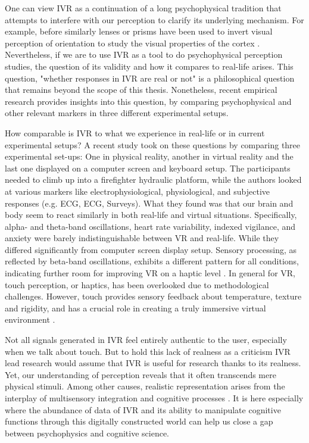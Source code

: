\documentclass[12pt,oneside,openright]{report}
\begin{document}
One can view IVR as a continuation of a long psychophysical tradition that attempts to interfere with our perception to clarify its underlying mechanism. For example, before similarly lenses or prisms have been used to invert visual perception of orientation to study the visual properties of the cortex \parencite{deGelder2018VirtualRA}. Nevertheless, if we are to use IVR as a tool to do psychophysical perception studies, the question of its validity and how it compares to real-life arises. This question, "whether responses in IVR are real or not" is a philosophical question that remains beyond the scope of this thesis. Nonetheless, recent empirical research provides insights into this question, by comparing psychophysical and other relevant markers in three different experimental setups.

How comparable is IVR to what we experience in real-life or in current experimental setups? A recent study took on these questions by comparing three experimental set-ups: One in physical reality, another in virtual reality and the last one displayed on a computer screen and keyboard setup. The participants needed to climb up into a firefighter hydraulic platform, while the authors looked at various markers like electrophysiological, physiological, and subjective responses (e.g. ECG, ECG, Surveys). What they found was that our brain and body seem to react similarly in both real-life and virtual situations. Specifically, alpha- and theta-band oscillations, heart rate variability, indexed vigilance, and anxiety were barely indistinguishable between VR and real-life. While they differed significantly from computer screen display setup. Sensory processing, as reflected by beta-band oscillations, exhibits a different pattern for all conditions, indicating further room for improving VR on a haptic level \parencite{Schne2023TheRO}. In general for VR, touch perception, or haptics, has been overlooked due to methodological challenges. However, touch provides sensory feedback about temperature, texture and rigidity, and has a crucial role in creating a truly immersive virtual environment \parencite{nature_Ed}.

Not all signals generated in IVR feel entirely authentic to the user, especially when we talk about touch. But to hold this lack of realness as a criticism IVR lead research would assume that IVR is useful for research thanks to its realness. Yet, our understanding of perception reveals that it often transcends mere physical stimuli. Among other causes, realistic representation arises from the interplay of multisensory integration and cognitive processes \parencite{deGelder2018VirtualRA}. It is here especially where the abundance of data of IVR and its ability to manipulate cognitive functions through this digitally constructed world can help us close a gap between psychophysics and cognitive science.
\end{document}
